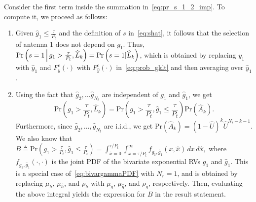 \documentclass[12pt,draftcls,peerreview,onecolumn]{IEEEtran}
\newcommand{\brac}[1]{\left({#1}\right)}
\newcommand{\define}{\triangleq}
\newcommand{\prob}[1]{\text{Pr}\brac{#1}}
\newcommand{\given}{\arrowvert}
\newcommand{\Given}{\Big\arrowvert}
\newcommand{\setA}{A}
\newcommand{\setAkhat}{\widehat{\setA}_k}
\newcommand{\setL}{L}
\newcommand{\setLkhat}{\widehat{\setL}_k}
\newcommand{\mug}{{\mu_{g}}}
\newcommand{\muh}{{\mu_{h}}}
\newcommand{\Nt}{{N_t}}
\newcommand{\Nr}{{N_r}}
\newcommand{\Pt}{{P_t}}
\newcommand{\such}{h}
\newcommand{\puch}{g}
\newcommand{\gk}[1]{{\puch_{#1}}}
\newcommand{\itau}{\tau}
\newcommand{\taubypt}{\frac{\itau}{\Pt}}
\newcommand{\gkgrtaubypt}[1]{{\gk{#1}}>\taubypt}
\newcommand{\gkhatlttaubypt}[1]{{\gkhat{#1}}\leq\taubypt}
\newcommand{\yk}[1]{y_{#1}}
\newcommand{\un}{U}
\newcommand{\unhat}{\widehat{\un}}
\newcommand{\gpilotpower}{P_g}
\newcommand{\hhat}{\hat{\such}}
\newcommand{\ghat}{\hat{\puch}}
\newcommand{\yhat}{\hat{y}}
\newcommand{\gkhat}[1]{\ghat_{#1}}
\newcommand{\ykhat}[1]{\hat{y}_{#1}}
\newcommand{\muhhat}{\mu_{\hhat}}
\newcommand{\mughat}{\mu_{\ghat}}
\newcommand{\Probglt}{B}
\newcommand{\rhog}{\rho_g}
\newcommand{\rhoh}{\rho_h}
\newcommand{\ccdfyrv}[1]{ F^{c}_{y}\left(#1 \right) }
\newcommand{\ccdfyhatrv}[1]{F^{c}_{\yhat}\left(#1 \right) }
\newcommand{\xhat}{\hat{x}}
\begin{document}
Consider the first term inside the summation in~\eqref{eq:pr_s_1_2_imp}. To compute it, we proceed as follows:
\begin{enumerate}
\item  Given $\gkhat{1}\leq\taubypt$ and the definition of $s$ in~\eqref{eq:shat}, it follows that the selection of antenna 1 does not depend on $\gk{1}$. Thus, $\prob{s = 1 \Given \gkgrtaubypt{1},\setLkhat}=\prob{s = 1 \given \setLkhat}$, %
which is obtained by replacing $\yk{1}$ with $\ykhat{1}$ and $\ccdfyrv{\cdot}$ with $\ccdfyhatrv{\cdot}$ in~\eqref{eq:prob_gklt} and then averaging over $\ykhat{1}$. 

\item Using the fact that $\gkhat{2},\ldots\gkhat{\Nt}$ are independent of $\gk{1}$ and $\gkhat{1}$, we get  
\begin{equation}
\prob{\gkgrtaubypt{1},\setLkhat} =\prob{\gkgrtaubypt{1},\gkhatlttaubypt{1}}\prob{\setAkhat}. 
\end{equation}
Furthermore, since $\gkhat{2},\ldots,\gkhat{\Nt}$ are i.i.d., we get $\prob{\setAkhat}=\left(1- \unhat \right)^{k} \unhat^{\Nt-k-1}$. We also know that 
$\Probglt\define\prob{\gkgrtaubypt{1},\gkhatlttaubypt{1}}=\int_{\xhat=0}^{\tau/\Pt}\int_{x=\tau/\Pt}^{\infty}f_{\gk{1},\gkhat{1}}\left(x,\xhat \right)\,dx\, d\xhat,$
where $f_{\gk{1},\gkhat{1}}\left(\cdot,\cdot \right)$ is the joint PDF of the bivariate exponential RVs $\gk{1}$ and $\gkhat{1}$.  This is a special case of~\eqref{eq:bivargammaPDF} with $\Nr=1$, and is obtained by replacing $\muh$, $\muhhat$, and $\rhoh$ with $\mug$, $\mughat$, and $\rhog$, respectively.
Then, evaluating the above integral yields the expression for $\Probglt$ in the result statement.


\end{enumerate}
\end{document}
